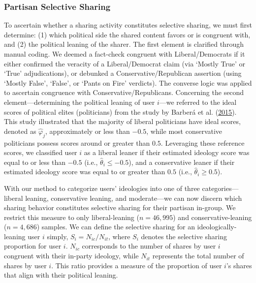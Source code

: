 \documentclass[
  12pt,
]{article}
\begin{document}
\hypertarget{partisan-selective-sharing}{%
\subsubsection{Partisan Selective
Sharing}\label{partisan-selective-sharing}}

To ascertain whether a sharing activity constitutes selective sharing,
we must first determine: (1) which political side the shared content
favors or is congruent with, and (2) the political leaning of the
sharer. The first element is clarified through manual coding. We deemed
a fact-check congruent with Liberal/Democrats if it either confirmed the
veracity of a Liberal/Democrat claim (via `Mostly True' or `True'
adjudications), or debunked a Conservative/Republican assertion (using
`Mostly False', `False', or `Pants on Fire' verdicts). The converse
logic was applied to ascertain congruence with Conservative/Republicans.
Concerning the second element---determining the political leaning of
user \(i\)---we referred to the ideal scores of political elites
(politicians) from the study by Barberá et al.
(\protect\hyperlink{ref-barbera2015tweeting}{2015}). This study
illustrated that the majority of liberal politicians have ideal scores,
denoted as \(\hat{\varphi}_j\), approximately or less than \(-0.5\),
while most conservative politicians possess scores around or greater
than \(0.5\). Leveraging these reference scores, we classified user
\(i\) as a liberal leaner if their estimated ideology score was equal to
or less than \(-0.5\) (i.e., \(\hat{\theta}_i \leq -0.5\)), and a
conservative leaner if their estimated ideology score was equal to or
greater than \(0.5\) (i.e., \(\hat{\theta}_i \geq 0.5\)).

With our method to categorize users' ideologies into one of three
categories---liberal leaning, conservative leaning, and moderate---we
can now discern which sharing behavior constitutes selective sharing for
their partisan in-group. We restrict this measure to only
liberal-leaning (\(n = 46,995\)) and conservative-leaning
(\(n = 4,686\)) samples. We can define the selective sharing for an
ideologically-leaning user \(i\) simply, \(S_i = N_{ic}/N_{it}\), where
\(S_i\) denotes the selective sharing proportion for user \(i\).
\(N_{ic}\) corresponds to the number of shares by user \(i\) congruent
with their in-party ideology, while \(N_{it}\) represents the total
number of shares by user \(i\). This ratio provides a measure of the
proportion of user \(i\)'s shares that align with their political
leaning.
\end{document}
